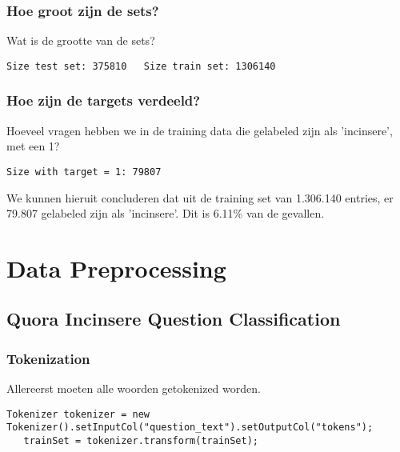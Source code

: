 \subsubsection{Hoe groot zijn de sets?}
Wat is de grootte van de sets?
\begin{lstlisting}[style=commentStyle]
Size test set: 375810   Size train set: 1306140
\end{lstlisting}
\subsubsection{Hoe zijn de targets verdeeld?}
Hoeveel vragen hebben we in de training data die gelabeled zijn als 'incinsere', met een 1?

\begin{lstlisting}[style=commentStyle]
    Size with target = 1: 79807
\end{lstlisting}
We kunnen hieruit concluderen dat uit de training set van 1.306.140 entries, er 79.807 gelabeled zijn als 'incinsere'. Dit is 6.11\% van de gevallen.


\section{Data Preprocessing}
\label{sec:preprocessing}
\subsection{Quora Incinsere Question Classification}
\subsubsection{Tokenization}
Allereerst moeten alle woorden getokenized worden.
\begin{lstlisting}[style=codeStyle]
   Tokenizer tokenizer = new Tokenizer().setInputCol("question_text").setOutputCol("tokens");
   trainSet = tokenizer.transform(trainSet);
\end{lstlisting}

